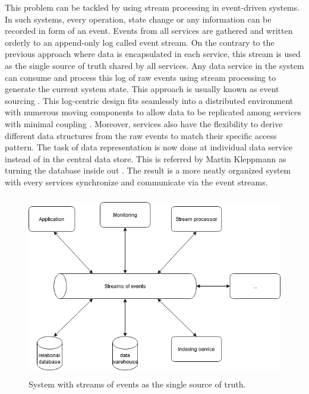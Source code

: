 This problem can be tackled by using stream processing in event-driven systems. In such systems, every operation, state change or any information can be recorded in form of an event. Events from all services are gathered and written orderly to an append-only log called event stream. On the contrary to the previous approach where data is encapsulated in each service, this stream is used as the single source of truth shared by all services. Any data service in the system can consume and process this log of raw events using stream processing to generate the current system state. This approach is usually known as event sourcing \cite{eventsourcing}. This log-centric design fits seamlessly into a distributed environment with numerous moving components to allow data to be replicated among services with minimal coupling \cite{logjaykreps}. Moreover, services also have the flexibility to derive different data structures from the raw events to match their specific access pattern. The task of data representation is now done at individual data service instead of in the central data store. This is referred by Martin Kleppmann as turning the database inside out \cite{kleppmann2016making}. The result is a more neatly organized system with every services synchronize and communicate via the event streams.

\begin{figure}[h]
	\includegraphics[width=\linewidth,height=8cm]{images/eventstreamprocessing.png}
	\caption{System with streams of events as the single source of truth.}
	\label{fig:eventstreamprocessingsystem}
\end{figure}

